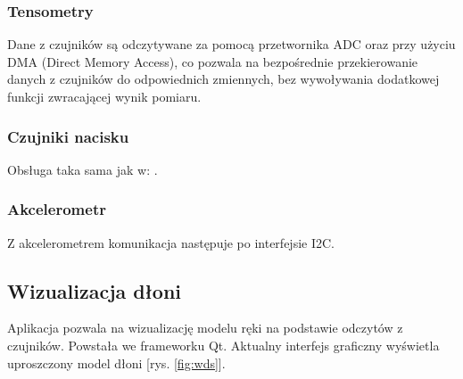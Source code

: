 \documentclass[12pt,a4paper]{article}
\begin{document}
\subsubsection{Tensometry} \label{tensometry}
Dane z czujników są odczytywane za pomocą przetwornika ADC oraz przy użyciu DMA (Direct Memory Access), co pozwala na bezpośrednie przekierowanie danych z czujników do odpowiednich zmiennych, bez wywoływania dodatkowej funkcji zwracającej wynik pomiaru.
\subsubsection{Czujniki nacisku}
Obsługa taka sama jak w: .
\subsubsection{Akcelerometr}
Z akcelerometrem komunikacja następuje po interfejsie I2C.



\subsection{Wizualizacja dłoni}
Aplikacja pozwala na wizualizację modelu ręki na podstawie odczytów z czujników. Powstała we frameworku Qt. Aktualny interfejs graficzny wyświetla uproszczony model dłoni [rys. \ref{fig:wds}].
\end{document}
